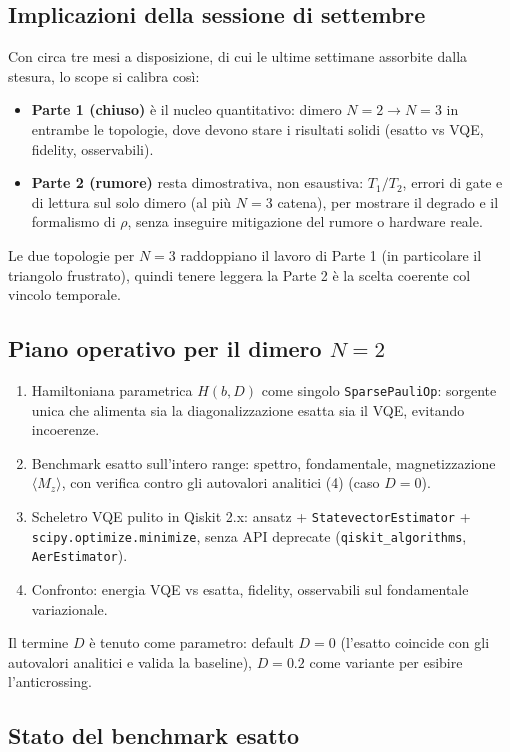 \documentclass[11pt,a4paper]{article}
\begin{document}
\subsection{Implicazioni della sessione di settembre}

Con circa tre mesi a disposizione, di cui le ultime settimane assorbite dalla
stesura, lo scope si calibra cos\`i:
\begin{itemize}
\item \textbf{Parte 1 (chiuso)} \`e il nucleo quantitativo: dimero $N=2\to N=3$ in
entrambe le topologie, dove devono stare i risultati solidi (esatto vs VQE, fidelity,
osservabili).
\item \textbf{Parte 2 (rumore)} resta dimostrativa, non esaustiva: $T_1/T_2$, errori
di gate e di lettura sul solo dimero (al pi\`u $N=3$ catena), per mostrare il degrado
e il formalismo di $\rho$, senza inseguire mitigazione del rumore o hardware reale.
\end{itemize}
Le due topologie per $N=3$ raddoppiano il lavoro di Parte 1 (in particolare il
triangolo frustrato), quindi tenere leggera la Parte 2 \`e la scelta coerente col
vincolo temporale.

\subsection{Piano operativo per il dimero $N=2$}

\begin{enumerate}
\item Hamiltoniana parametrica $H(b,D)$ come singolo \texttt{SparsePauliOp}: sorgente
unica che alimenta sia la diagonalizzazione esatta sia il VQE, evitando incoerenze.
\item Benchmark esatto sull'intero range: spettro, fondamentale, magnetizzazione
$\langle M_z\rangle$, con verifica contro gli autovalori analitici (4) (caso $D=0$).
\item Scheletro VQE pulito in Qiskit 2.x: ansatz + \texttt{StatevectorEstimator} +
\texttt{scipy.optimize.minimize}, senza API deprecate (\texttt{qiskit\_algorithms},
\texttt{AerEstimator}).
\item Confronto: energia VQE vs esatta, fidelity, osservabili sul fondamentale
variazionale.
\end{enumerate}
Il termine $D$ \`e tenuto come parametro: default $D=0$ (l'esatto coincide con gli
autovalori analitici e valida la baseline), $D=0.2$ come variante per esibire
l'anticrossing.

\subsection{Stato del benchmark esatto}
\end{document}
